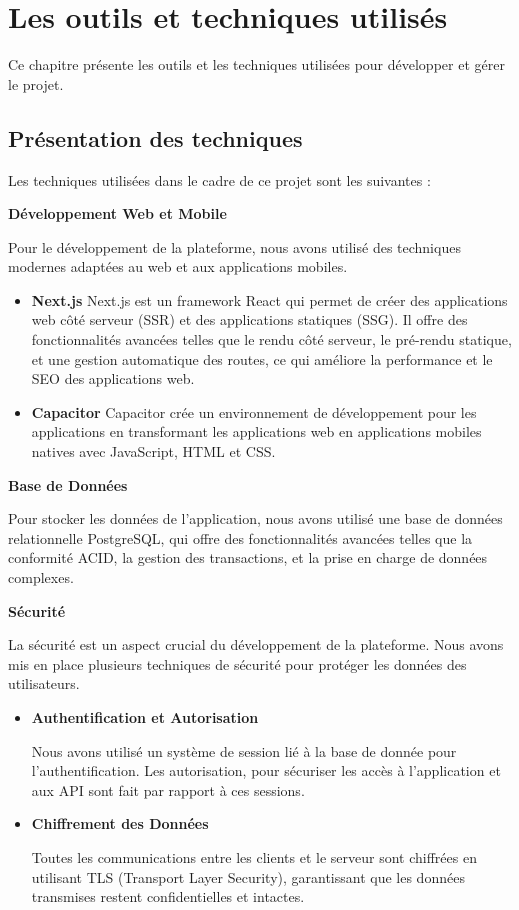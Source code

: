 \chapter{Les outils et techniques utilisés}
Ce chapitre présente les outils et les techniques utilisées pour développer
et gérer le projet.

\section{Présentation des techniques}
Les techniques utilisées dans le cadre de ce projet sont les suivantes :

  \textbf{ {Développement Web et Mobile}}

    Pour le développement de la plateforme, nous avons utilisé des techniques
    modernes adaptées au web et aux applications mobiles.
    \begin {itemize}
  \item \textbf{{Next.js}}
    Next.js est un framework React qui permet de créer des applications web côté
    serveur (SSR) et des applications statiques (SSG). Il offre des fonctionnalités
    avancées telles que le rendu côté serveur, le pré-rendu statique, et une
    gestion automatique des routes, ce qui améliore la performance et le
    SEO des applications web.

  \item \textbf{{Capacitor}}
    Capacitor crée un environnement de développement pour les applications en
    transformant les applications web en applications mobiles natives avec
    JavaScript, HTML et CSS.

\end{itemize}

\textbf{{Base de Données}}

  Pour stocker les données de l'application, nous avons utilisé une base de
  données relationnelle PostgreSQL, qui offre des fonctionnalités avancées
  telles que la conformité ACID, la gestion des transactions, et la prise en
  charge de données complexes.

\textbf{{Sécurité}}

  La sécurité est un aspect crucial du développement de la plateforme. Nous
  avons mis en place plusieurs techniques de sécurité pour protéger les données
  des utilisateurs.
  \begin{itemize}
    \item \textbf{{Authentification et Autorisation}}

      Nous avons utilisé un système de session lié à la base de donnée pour
      l'authentification. Les autorisation, pour sécuriser les accès
      à l'application et aux API sont fait par rapport à ces sessions.

    \item \textbf{{Chiffrement des Données}}

      Toutes les communications entre les clients et le serveur sont chiffrées
      en utilisant TLS (Transport Layer Security), garantissant que les données
      transmises restent confidentielles et intactes.
  \end{itemize}

